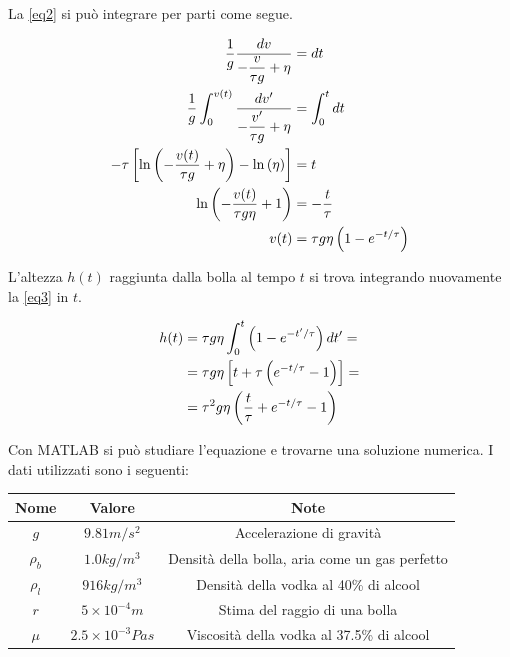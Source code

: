 \documentclass{article}
\begin{document}
La \eqref{eq2} si può integrare per parti come segue.

\begin{align}\label{eq3}
    \frac{1}{g} \frac{dv}{-\dfrac{v}{\tau g} + \eta} &= dt\notag\\
    \frac{1}{g} \int_0^{v(t)}\frac{dv'}{-\dfrac{v'}{\tau g} + \eta} &= \int_0^t dt\notag\\
    -\tau \left[\ln{\left( -\frac{v(t)}{\tau g} + \eta \right) - \ln{\left( \eta \right)}}\right] &= t\notag\\
    \ln{\left( -\frac{v(t)}{\tau g \eta} + 1 \right)} &= - \frac{t}{\tau}\notag\\
    v(t) &= \tau g \eta \left( 1 - e^{-t/\tau} \right)
\end{align}

L'altezza $h(t)$ raggiunta dalla bolla al tempo $t$ si trova integrando nuovamente la \eqref{eq3} in $t$.

\begin{align}
    h(t) &= \tau g \eta \int_0^t \left( 1 - e^{-t'/\tau} \right) dt' =\notag\\
    &= \tau g \eta \left[ t + \tau \left(e ^ {-t/\tau} - 1\right) \right] =\notag\\
    &= \tau^2 g \eta \left(\frac{t}{\tau} + e^{-t/\tau} - 1\right)
\end{align}

Con MATLAB si può studiare l'equazione e trovarne una soluzione numerica. I dati utilizzati sono i seguenti:

\begin{table}[ht!]
\centering
    \begin{tabular}{|c|c|c|}
        \hline
        Nome & Valore & Note \\
        \hline
        $g$ & $9.81 m/s^2$ & Accelerazione di gravità \\
        \hline
        $\rho_b$ & $1.0 kg/m^3$ & Densità della bolla, aria come un gas perfetto \\
        \hline
        $\rho_l$ & $916 kg/m^3$ & Densità della vodka al 40\% di alcool\\
        \hline
        $r$ & $5\times10^{-4}m$ & Stima del raggio di una bolla\\
        \hline
        $\mu$ & $2.5\times10^{-3}Pa s$ & Viscosità della vodka al 37.5\% di alcool\\
        \hline
    \end{tabular}
\end{table}
\end{document}
